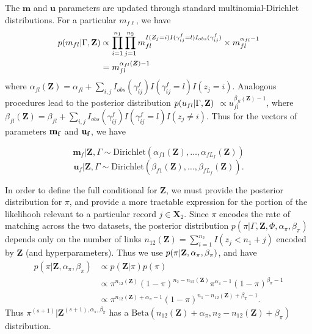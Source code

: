 \documentclass[ba]{imsart}
\begin{document}
The $\bm{m}$ and $\bm{u}$ parameters are updated through standard multinomial-Dirichlet distributions. For a particular $m_{f\ell}$, we have
\begin{align*}
	p(m_{fl}| \Gamma, \bf{Z}) &\propto \prod_{i=1}^{n_1} \prod_{j=1}^{n_2} m_{fl}^{I(Z_j = i) I(\gamma_{ij}^f = l) I_{obs}(\gamma_{ij}^f)} \times  m_{fl}^{\alpha_{fl} - 1} \\
	&= m_{fl}^{\alpha_{fl}(\bm{Z}) - 1}
\end{align*}
where $\alpha_{fl}(\bm{Z})= \alpha_{fl} + \sum_{i,j} I_{obs}(\gamma_{ij}^f)I(\gamma_{ij}^f = l) I(z_j = i)$. Analogous procedures lead to the posterior distribution $p(u_{fl}| \Gamma, \bf{Z})$  $\propto u_{fl}^{\beta_{fl}(\bm{Z}) - 1}$, where $\beta_{fl}(\bm{Z})= \beta_{fl} + \sum_{i,j} I_{obs}(\gamma_{ij}^f)I(\gamma_{ij}^f = l) I(z_j \neq i)$. Thus for the vectors of parameters $\bf{m}_f$ and $\bf{u}_f$, we have

$$\bm{m}_f|\bm{Z}, \Gamma \sim \text{Dirichlet}(\alpha_{f1}(\bm{Z}), \ldots, \alpha_{fL_f}(\bm{Z}))$$
$$\bm{u}_f|\bm{Z}, \Gamma \sim \text{Dirichlet}(\beta_{f1}(\bm{Z}), \ldots, \beta_{fL_f}(\bm{Z})).$$

In order to define the full conditional for $\bm{Z}$, we must provide the posterior distribution for $\pi$, and provide a more tractable expression for the portion of the likelihooh relevant to a particular record $j \in \bm{X}_2$. Since $\pi$ encodes the rate of matching across the two datasets, the posterior distribution $p(\pi|\Gamma, \bm{Z}, \Phi, \alpha_{\pi}, \beta_{\pi})$ depends only on the number of links $n_{12}(\bm{Z}) = \sum_{i=1}^{n_2}I(z_j < n_1 + j)$ encoded by $\bm{Z}$ (and hyperparameters). Thus we use $p(\pi | \bf{Z}, \alpha_{\pi}, \beta_{\pi})$, and have 
\begin{align*}
	p(\pi | \bm{Z}, \alpha_{\pi}, \beta_{\pi}) &\propto p(\bm{Z}|\pi)p(\pi) \\
	&\propto \pi^{n_{12}(\bm{Z})} (1-\pi)^{n_2 - n_{12}(\bm{Z})} \pi^{\alpha_{\pi} -1} (1-\pi)^{\beta_{\pi} -1} \\
	&\propto \pi^{n_{12}(\bm{Z}) + \alpha_{\pi} - 1} (1-\pi)^{n_1 - n_{12}(\bm{Z}) + \beta_{\pi} -1}.
\end{align*}
Thus $\pi^{(s+1)}|\bm{Z}^{(s+1),  \alpha_{\pi}, \beta_{\pi}}$ has a $\text{Beta}(n_{12}(\bm{Z}) + \alpha_{\pi}, n_2 - n_{12}(\bm{Z}) + \beta_{\pi})$ distribution.
\end{document}
